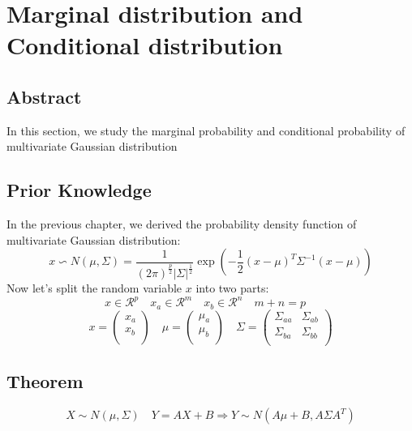 \documentclass{report}
\begin{document}
\section{Marginal distribution and Conditional distribution}
\subsection{Abstract}
In this section, we study the marginal probability and conditional probability of multivariate Gaussian distribution
\subsection{Prior Knowledge}
In the previous chapter, we derived the probability density function of multivariate Gaussian distribution:
$$
x \backsim N(\mu, \Sigma) = \frac{1}{(2\pi)^{\frac{p}{2}}|\Sigma|^\frac{1}{2}}\exp(-\frac{1}{2}(x-\mu)^T \Sigma^{-1}(x-\mu))
$$
Now let's split the random variable $x$ into two parts:
$$
x \in \mathcal{R}^p \quad x_a \in \mathcal{R}^m \quad x_b \in \mathcal{R}^n \quad m+n=p \quad 
$$
$$
x = 
\left (
\begin{matrix}
x_a \\
x_b \\
\end{matrix}
\right )
\quad 
\mu = 
\left (
\begin{matrix}
\mu_a \\
\mu_b \\
\end{matrix}
\right ) \quad
\Sigma=
\left (
\begin{matrix}
\Sigma_{aa} & \Sigma_{ab}\\
\Sigma_{ba} & \Sigma_{bb}\\
\end{matrix}
\right )
$$
\subsection{Theorem}
$$
X \sim N(\mu, \Sigma) \quad Y=AX+B  \Longrightarrow Y \sim N(A\mu+B, A \Sigma A^T)
$$
\end{document}
